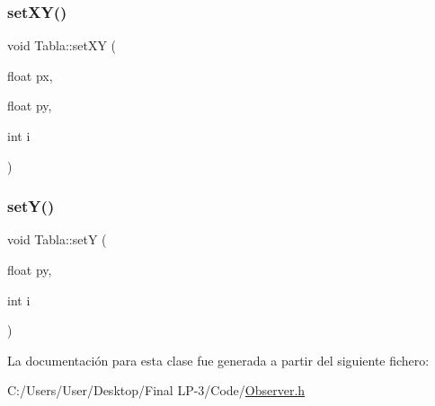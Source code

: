 \subsubsection{\texorpdfstring{setXY()}{setXY()}}
{\footnotesize\ttfamily void Tabla\+::set\+XY (\begin{DoxyParamCaption}\item[{float}]{px,  }\item[{float}]{py,  }\item[{int}]{i }\end{DoxyParamCaption})\hspace{0.3cm}{\ttfamily [inline]}}

\mbox{\label{class_tabla_a00156dd75bcd77389a6586f20e15a71c}} 
\subsubsection{\texorpdfstring{setY()}{setY()}}
{\footnotesize\ttfamily void Tabla\+::setY (\begin{DoxyParamCaption}\item[{float}]{py,  }\item[{int}]{i }\end{DoxyParamCaption})\hspace{0.3cm}{\ttfamily [inline]}}



La documentación para esta clase fue generada a partir del siguiente fichero\+:\begin{DoxyCompactItemize}
\item 
C\+:/\+Users/\+User/\+Desktop/\+Final L\+P-\/3/\+Code/\mbox{\hyperlink{_observer_8h}{Observer.\+h}}\end{DoxyCompactItemize}
